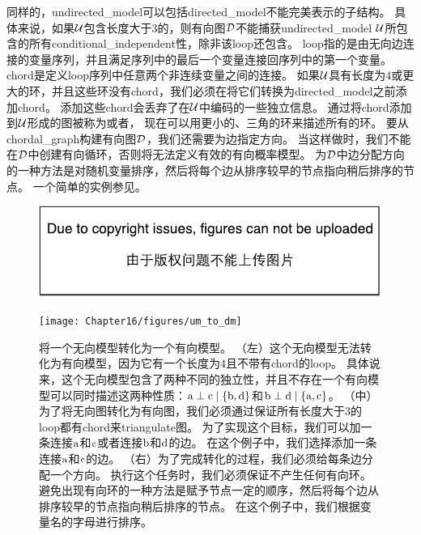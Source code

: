 同样的，\gls{undirected_model}可以包括\gls{directed_model}不能完美表示的子结构。
具体来说，如果$\mathcal{U}$包含长度大于$3$的，则有向图$\mathcal{D}$不能捕获\gls{undirected_model} $\mathcal{U}$所包含的所有\gls{conditional_independent}性，除非该\gls{loop}还包含。
\gls{loop}指的是由无向边连接的变量序列，并且满足序列中的最后一个变量连接回序列中的第一个变量。
\gls{chord}是定义\gls{loop}序列中任意两个非连续变量之间的连接。
如果$\mathcal{U}$具有长度为$4$或更大的环，并且这些环没有\gls{chord}，我们必须在将它们转换为\gls{directed_model}之前添加\gls{chord}。
添加这些\gls{chord}会丢弃了在$\mathcal{U}$中编码的一些独立信息。
通过将\gls{chord}添加到$\mathcal{U}$形成的图被称为或者，
现在可以用更小的、三角的环来描述所有的环。
要从\gls{chordal_graph}构建有向图$\mathcal{D}$，我们还需要为边指定方向。
当这样做时，我们不能在$\mathcal{D}$中创建有向循环，否则将无法定义有效的有向概率模型。
为$\mathcal{D}$中边分配方向的一种方法是对随机变量排序，然后将每个边从排序较早的节点指向稍后排序的节点。
一个简单的实例参见。



\begin{figure}[!htb]
\ifOpenSource
\centerline{\includegraphics{figure.pdf}}
\else
	\centerline{\texttt{[image: Chapter16/figures/um\_to\_dm]}}	
\fi
\caption{将一个无向模型转化为一个有向模型。
（左）这个无向模型无法转化为有向模型，因为它有一个长度为$4$且不带有\gls{chord}的\gls{loop}。
具体说来，这个无向模型包含了两种不同的独立性，并且不存在一个有向模型可以同时描述这两种性质：$\mathrm{a}\perp \mathrm{c} \mid \{\mathrm{b},\mathrm{d}\}$和$\mathrm{b} \perp \mathrm{d} \mid \{\mathrm{a},\mathrm{c}\}$。
（中）为了将无向图转化为有向图，我们必须通过保证所有长度大于$3$的\gls{loop}都有\gls{chord}来\gls{triangulate}图。
为了实现这个目标，我们可以加一条连接$\mathrm{a}$和$\mathrm{c}$或者连接$\mathrm{b}$和$\mathrm{d}$的边。
在这个例子中，我们选择添加一条连接$\mathrm{a}$和$\mathrm{c}$的边。
（右）为了完成转化的过程，我们必须给每条边分配一个方向。
执行这个任务时，我们必须保证不产生任何有向环。
避免出现有向环的一种方法是赋予节点一定的顺序，然后将每个边从排序较早的节点指向稍后排序的节点。
在这个例子中，我们根据变量名的字母进行排序。}
	\label{fig:um_to_dm}
\end{figure}



